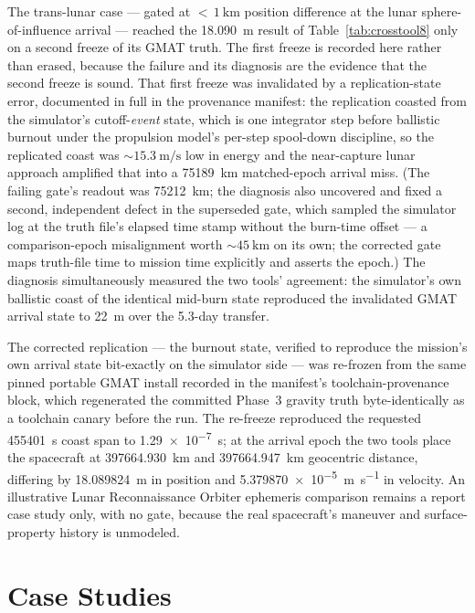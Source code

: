 \documentclass[10pt]{article}
\begin{document}
The trans-lunar case --- gated at ${<}\,\SI{1}{\kilo\meter}$ position
difference at the lunar sphere-of-influence arrival --- reached the
\SI{18.090}{\meter} result of Table~\ref{tab:crosstool8} only on a second
freeze of its GMAT truth. The first freeze is recorded here rather than erased,
because the failure and its diagnosis are the evidence that the second freeze
is sound. That first freeze was invalidated by a replication-state error,
documented in full in the provenance
manifest: the replication coasted from the simulator's cutoff-\emph{event}
state, which is one integrator step before ballistic burnout under the
propulsion model's per-step spool-down discipline, so the replicated coast was
$\sim\!\SI{15.3}{\meter\per\second}$ low in energy and the near-capture lunar
approach amplified that into a \SI{75189}{\kilo\meter} matched-epoch arrival
miss. (The failing gate's readout was \SI{75212}{\kilo\meter}; the diagnosis
also uncovered and fixed a second, independent defect in the superseded gate,
which sampled the simulator log at the truth file's elapsed time stamp without
the burn-time offset --- a comparison-epoch misalignment worth
$\sim\!\SI{45}{\kilo\meter}$ on its own; the corrected gate maps truth-file
time to mission time explicitly and asserts the epoch.) The
diagnosis simultaneously measured the two tools' agreement: the simulator's
own ballistic coast of the identical mid-burn state reproduced the invalidated
GMAT arrival state to \SI{22}{\meter} over the 5.3-day transfer.

The corrected replication --- the burnout state, verified to reproduce the
mission's own arrival state bit-exactly on the simulator side --- was re-frozen
from the same pinned portable GMAT install recorded in the manifest's
toolchain-provenance block, which regenerated the committed Phase~3 gravity
truth byte-identically as a toolchain canary before the run. The re-freeze
reproduced the requested \SI{455401}{\second} coast span to
\SI{1.29e-7}{\second}; at the arrival epoch the two tools place the spacecraft
at \SI{397664.930}{\kilo\meter} and \SI{397664.947}{\kilo\meter} geocentric
distance, differing by \SI{18.089824}{\meter} in position and
\SI{5.379870e-5}{\meter\per\second} in velocity. An illustrative
Lunar Reconnaissance Orbiter ephemeris comparison remains a report case study
only, with no gate, because the real spacecraft's maneuver and
surface-property history is unmodeled.

\section{Case Studies}
\label{sec:cases}
\end{document}

